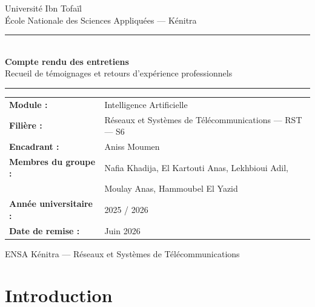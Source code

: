 \documentclass[12pt,a4paper]{article}
\begin{document}
\begin{titlepage}
  \centering
  \vspace*{1.5cm}
  {\large Universit\'{e} Ibn Tofa\"{i}l}\\[0.3em]
  {\normalsize \'{E}cole Nationale des Sciences Appliqu\'{e}es --- K\'{e}nitra}
  \vspace{1.5cm}

  \rule{\textwidth}{0.8pt}\\[0.6em]
  {\LARGE\bfseries Compte rendu des entretiens}\\[0.5em]
  {\large Recueil de t\'{e}moignages et retours d'exp\'{e}rience professionnels}\\[0.4em]
  \rule{\textwidth}{0.4pt}

  \vspace{1.5cm}
  \begin{tabular}{@{}ll@{}}
    \textbf{Module :}          & Intelligence Artificielle \\[5pt]
    \textbf{Fili\`{e}re :}    & R\'{e}seaux et Syst\`{e}mes de T\'{e}l\'{e}communications --- RST --- S6 \\[5pt]
    \textbf{Encadrant :}       & Aniss Moumen \\[5pt]
    \textbf{Membres du groupe :} & Nafia Khadija, El Kartouti Anas, Lekhbioui Adil, \\
                               & Moulay Anas, Hammoubel El Yazid \\[5pt]
    \textbf{Ann\'{e}e universitaire :} & 2025 / 2026 \\[5pt]
    \textbf{Date de remise :}  & Juin 2026 \\
  \end{tabular}

  \vfill
  {\small ENSA K\'{e}nitra --- R\'{e}seaux et Syst\`{e}mes de T\'{e}l\'{e}communications}
\end{titlepage}

\tableofcontents
\clearpage

\section*{Introduction}
\end{document}
